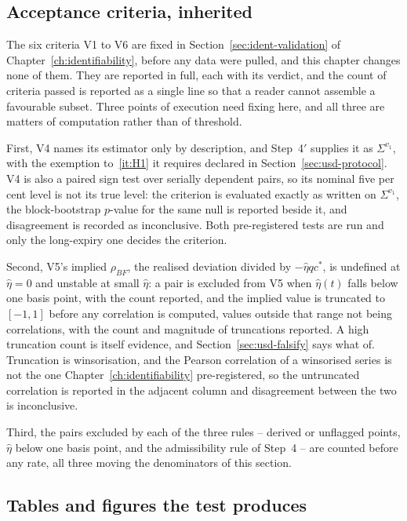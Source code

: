 \documentclass[../../../main.tex]{subfiles}
\begin{document}
\subsection{Acceptance criteria, inherited}

The six criteria V1 to V6 are fixed in Section~\ref{sec:ident-validation} of Chapter~\ref{ch:identifiability}, before any data were pulled, and this chapter changes none of them. They are reported in full, each with its verdict, and the count of criteria passed is reported as a single line so that a reader cannot assemble a favourable subset. Three points of execution need fixing here, and all three are matters of computation rather than of threshold.

First, V4 names its estimator only by description, and Step~4$'$ supplies it as $\Sigma^{v_1}$, with the exemption to~\ref{it:H1} it requires declared in Section~\ref{sec:usd-protocol}. V4 is also a paired sign test over serially dependent pairs, so its nominal five per cent level is not its true level: the criterion is evaluated exactly as written on $\Sigma^{v_1}$, the block-bootstrap $p$-value for the same null is reported beside it, and disagreement is recorded as inconclusive. Both pre-registered tests are run and only the long-expiry one decides the criterion.

Second, V5's implied $\rho_{BF}$, the realised deviation divided by $-\hat\eta qc^*$, is undefined at $\hat\eta=0$ and unstable at small $\hat\eta$: a pair is excluded from V5 when $\hat\eta(t)$ falls below one basis point, with the count reported, and the implied value is truncated to $[-1,1]$ before any correlation is computed, values outside that range not being correlations, with the count and magnitude of truncations reported. A high truncation count is itself evidence, and Section~\ref{sec:usd-falsify} says what of. Truncation is winsorisation, and the Pearson correlation of a winsorised series is not the one Chapter~\ref{ch:identifiability} pre-registered, so the untruncated correlation is reported in the adjacent column and disagreement between the two is inconclusive.

Third, the pairs excluded by each of the three rules -- derived or unflagged points, $\hat\eta$ below one basis point, and the admissibility rule of Step~4 -- are counted before any rate, all three moving the denominators of this section.

\subsection{Tables and figures the test produces}
\end{document}
